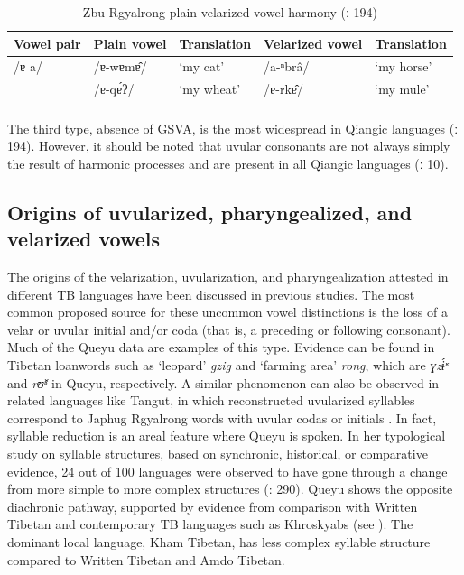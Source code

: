 \documentclass[output=paper]{langscibook}
\begin{document}
\begin{table}
\caption{Zbu Rgyalrong plain-velarized vowel harmony (\citealt{Gong2020}ː 194)}
\label{tab:guan:13}
\begin{tabularx}{\textwidth}{XXXll}
\lsptoprule
Vowel pair & {Plain vowel} & {Translation} & {Velarized vowel} & {Translation}\\
\midrule
/ɐ a/    & {/ɐ-wɐmɐ̂/} & {‘my cat’} & {/a-ⁿbrâ/} & {‘my horse’}\\
         & {/ɐ-qɐ́ʔ/} & {‘my wheat’} & {/ɐ-rkɐ̂/} & {‘my mule’}\\
\lspbottomrule
\end{tabularx}
\end{table}


The third type, absence of GSVA, is the most widespread in Qiangic languages (\citealt{Gong2020}ː 194). However, it should be noted that uvular consonants are not always simply the result of harmonic processes and are present in all Qiangic languages (\citealt{Sun2016}ː 10). 

\subsection{Origins of uvularized, pharyngealized, and velarized vowels}\label{sec:guan:3.5}

The origins of the velarization, uvularization, and pharyngealization attested in different TB languages have been discussed in previous studies. The most common proposed source for these uncommon vowel distinctions is the loss of a velar or uvular initial and/or coda (that is, a preceding or following consonant). Much of the Queyu data are examples of this type. Evidence can be found in Tibetan loanwords such as ‘leopard’ \textit{gzig} and ‘farming area’ \textit{rong}, which are \textit{ɣzɨ́ʶ} and \textit{rʊ̌ʶ} in Queyu, respectively. A similar phenomenon can also be observed in related languages like Tangut, in which reconstructed uvularized syllables correspond to Japhug Rgyalrong words with uvular codas or initials \citep{Gong2020}. In fact, syllable reduction is an areal feature where Queyu is spoken. In her typological study on syllable structures, based on synchronic, historical, or comparative evidence, 24 out of 100 languages were observed to have gone through a change from more simple to more complex structures (\citealt{Easterday2019}: 290). Queyu shows the opposite diachronic pathway, supported by evidence from comparison with Written Tibetan and contemporary TB languages such as Khroskyabs (see ). The dominant local language, Kham Tibetan, has less complex syllable structure compared to Written Tibetan and Amdo Tibetan.
\end{document}
